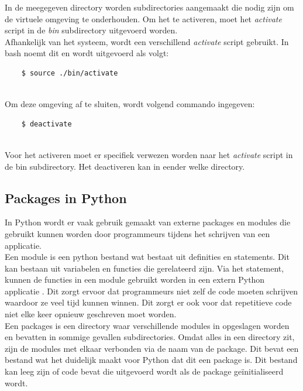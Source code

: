 In de meegegeven directory worden subdirectories aangemaakt die nodig zijn om de virtuele omgeving te onderhouden. Om het te activeren, moet het \textit{activate} script in de \textit{bin} subdirectory uitgevoerd worden. \autocite{PSF2024} \\
Afhankelijk van het systeem, wordt een verschillend \textit{activate} script gebruikt. In bash noemt dit  en wordt uitgevoerd als volgt:
\begin{lstlisting}
    $ source ./bin/activate
    
\end{lstlisting}

Om deze omgeving af te sluiten, wordt volgend commando ingegeven:
\begin{lstlisting}
    $ deactivate
    
\end{lstlisting}

Voor het activeren moet er specifiek verwezen worden naar het \textit{activate} script in de bin subdirectory. Het deactiveren kan in eender welke directory.

\subsection{Packages in Python}
In Python wordt er vaak gebruik gemaakt van externe packages en modules die gebruikt kunnen worden door programmeurs tijdens het schrijven van een applicatie. \\
Een module is een python bestand wat bestaat uit definities en statements. Dit kan bestaan uit variabelen en functies die gerelateerd zijn. Via het  statement, kunnen de functies in een module gebruikt worden in een extern Python applicatie \autocite{Singh2024}. Dit zorgt ervoor dat programmeurs niet zelf de code moeten schrijven waardoor ze veel tijd kunnen winnen. Dit zorgt er ook voor dat repetitieve code niet elke keer opnieuw geschreven moet worden.\\

Een packages is een directory waar verschillende modules in opgeslagen worden en bevatten in sommige gevallen subdirectories. Omdat alles in een directory zit, zijn de modules met elkaar verbonden via de naam van de package. Dit bevat een  bestand wat het duidelijk maakt voor Python dat dit een package is. Dit bestand kan leeg zijn of code bevat die uitgevoerd wordt als de package geïnitialiseerd wordt. \autocite{Udacity2021} \\


